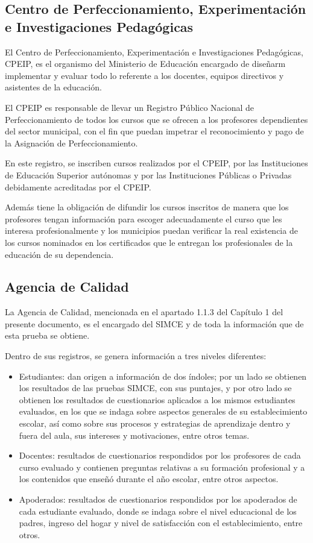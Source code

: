 \subsection{Centro de Perfeccionamiento, Experimentación e Investigaciones Pedagógicas}
El Centro de Perfeccionamiento, Experimentación e Investigaciones Pedagógicas, CPEIP, es el organismo del Ministerio de Educación encargado de diseñarm implementar y evaluar todo lo referente a los docentes, equipos directivos y asistentes de la educación.

El CPEIP es responsable de llevar un Registro Público Nacional de Perfeccionamiento de todos los cursos que se ofrecen a los profesores dependientes del sector municipal, con el fin que puedan impetrar el reconocimiento y pago de la Asignación de Perfeccionamiento.
 
En este registro, se inscriben cursos realizados por el CPEIP, por las Instituciones de Educación Superior autónomas y por las Instituciones Públicas o Privadas debidamente acreditadas por el CPEIP.
 
Además tiene la obligación de difundir los cursos inscritos de manera que los profesores tengan información para escoger adecuadamente el curso que les interesa profesionalmente y los municipios puedan verificar la real existencia de los cursos nominados en los certificados que le entregan los profesionales de la educación de su dependencia.

\subsection{Agencia de Calidad}
La Agencia de Calidad, mencionada en el apartado 1.1.3 del Capítulo 1 del presente documento, es el encargado del SIMCE y de toda la información que de esta prueba se obtiene. 

Dentro de sus registros, se genera información a tres niveles diferentes: 
\begin{itemize}
\item Estudiantes: dan origen a información de dos índoles; por un lado se obtienen los resultados de las pruebas SIMCE, con sus puntajes, y por otro lado se obtienen los resultados de cuestionarios aplicados a los mismos estudiantes evaluados, en los que se indaga sobre aspectos generales de su establecimiento escolar, así como sobre sus procesos y estrategias de aprendizaje dentro y fuera del aula, sus intereses y motivaciones, entre otros temas.
\item Docentes: resultados de cuestionarios respondidos por los profesores de cada curso evaluado y contienen preguntas relativas a su formación profesional y a los contenidos que enseñó durante el año escolar, entre otros aspectos.
\item Apoderados: resultados de cuestionarios respondidos por los apoderados de cada estudiante evaluado, donde se indaga sobre el nivel educacional de los padres, ingreso del hogar y nivel de satisfacción con el establecimiento, entre otros.
\end{itemize}

